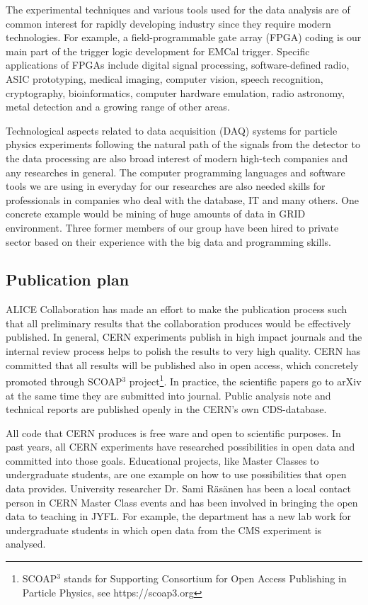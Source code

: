 The experimental techniques and various tools used for the data analysis are of common interest for rapidly developing industry since they require modern technologies. For example, a field-programmable gate array (FPGA) coding is our main part of the trigger logic development for EMCal trigger. Specific applications of FPGAs include digital signal processing, software-defined radio, ASIC prototyping, medical imaging, computer vision, speech recognition, cryptography, bioinformatics, computer hardware emulation, radio astronomy, metal detection and a growing range of other areas.

Technological aspects related to data acquisition (DAQ) systems for particle physics experiments following the natural path of the signals from the detector to the data processing are also broad interest of modern high-tech companies and any researches in general. The computer programming languages and software tools we are using in everyday for our researches are also needed skills for professionals in companies  who deal with the database, IT and many others. One concrete example would be mining of huge amounts of data in GRID environment. Three former members of our group have been hired to private sector based on their experience with the big data and programming skills.

\subsection{Publication plan}

ALICE Collaboration has made an effort to make the publication process such that all preliminary results that the collaboration produces would be effectively published. In general, CERN experiments publish in high impact journals and the internal review process helps to polish the results to very high quality. CERN has committed that all results will be published also in open access, which concretely promoted through SCOAP$^3$ project\footnote{SCOAP$^3$ stands for Supporting Consortium for Open Access Publishing in Particle Physics, see https://scoap3.org}. In practice, the scientific papers go to arXiv at the same time they are submitted into journal. Public analysis note and technical reports are published openly in the CERN's own CDS-database.

All code that CERN produces is free ware and open to scientific purposes. In past years, all CERN experiments have researched possibilities in open data and committed into those goals. Educational projects, like Master Classes to undergraduate students, are one example on how to use possibilities that open data provides. University researcher Dr. Sami R\"as\"anen has been a local contact person in CERN Master Class events and has been involved in bringing the open data to teaching in JYFL. For example, the department has a new lab work for undergraduate students in which open data from the CMS experiment is analysed.

\nopagebreak
